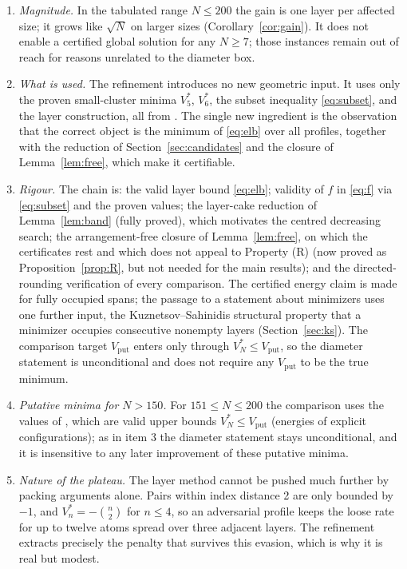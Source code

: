 \documentclass[11pt]{article}
\theoremstyle{remark}
\newcommand{\vput}{\mathrm{put}}
\begin{document}
\begin{enumerate}
\item \emph{Magnitude.} In the tabulated range $N\le200$ the gain is one layer per affected size; it grows like $\sqrt N$ on larger sizes (Corollary~\ref{cor:gain}). It does not enable a certified global solution for any $N\ge7$; those instances remain out of reach for reasons unrelated to the diameter box.

\item \emph{What is used.} The refinement introduces no new geometric input. It uses only the proven small-cluster minima $V^*_5$, $V^*_6$, the subset inequality \eqref{eq:subset}, and the layer construction, all from \cite{vanaret2014,ks2025}. The single new ingredient is the observation that the correct object is the minimum of \eqref{eq:elb} over all profiles, together with the reduction of Section~\ref{sec:candidates} and the closure of Lemma~\ref{lem:free}, which make it certifiable.

\item \emph{Rigour.} The chain is: the valid layer bound \eqref{eq:elb}; validity of $f$ in \eqref{eq:f} via \eqref{eq:subset} and the proven values; the layer-cake reduction of Lemma~\ref{lem:band} (fully proved), which motivates the centred decreasing search; the arrangement-free closure of Lemma~\ref{lem:free}, on which the certificates rest and which does not appeal to Property (R) (now proved as Proposition~\ref{prop:R}, but not needed for the main results); and the directed-rounding verification of every comparison. The certified energy claim is made for fully occupied spans; the passage to a statement about minimizers uses one further input, the Kuznetsov--Sahinidis structural property that a minimizer occupies consecutive nonempty layers (Section~\ref{sec:ks}). The comparison target $V_\vput$ enters only through $V^*_N\le V_\vput$, so the diameter statement is unconditional and does not require any $V_\vput$ to be the true minimum.

\item \emph{Putative minima for $N>150$.} For $151\le N\le200$ the comparison uses the values of \cite{romero1999}, which are valid upper bounds $V^*_N\le V_\vput$ (energies of explicit configurations); as in item 3 the diameter statement stays unconditional, and it is insensitive to any later improvement of these putative minima.

\item \emph{Nature of the plateau.} The layer method cannot be pushed much further by packing arguments alone. Pairs within index distance 2 are only bounded by $-1$, and $V^*_n=-\binom n2$ for $n\le4$, so an adversarial profile keeps the loose rate for up to twelve atoms spread over three adjacent layers. The refinement extracts precisely the penalty that survives this evasion, which is why it is real but modest.
\end{enumerate}
\end{document}
